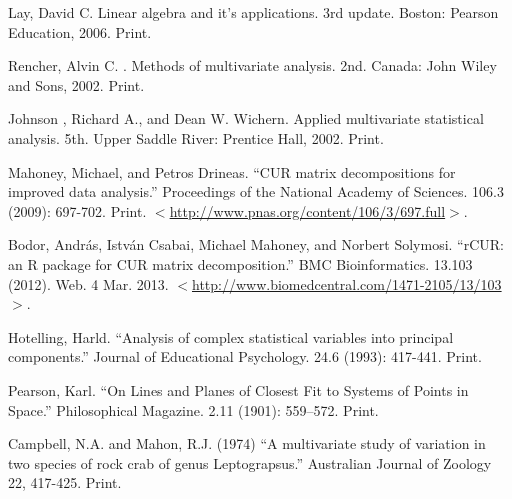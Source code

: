 \documentclass{book}
\begin{document}
\begin{thebibliography}{1}

 Lay, David C. Linear algebra and it's applications. 3rd update. Boston: Pearson Education, 2006. Print.

  Rencher, Alvin C. . Methods of multivariate analysis. 2nd. Canada: John Wiley and Sons, 2002. Print.

  Johnson , Richard A., and Dean W. Wichern. Applied multivariate statistical analysis. 5th. Upper Saddle River: Prentice Hall, 2002. Print.

   Mahoney, Michael, and Petros Drineas. ``CUR matrix decompositions for improved data analysis.'' Proceedings of the National Academy of Sciences. 106.3 (2009): 697-702. Print. $<$\href{http://www.pnas.org/content/106/3/697.full}{http://www.pnas.org/content/106/3/697.full}$>$.

   Bodor, András, István Csabai, Michael Mahoney, and Norbert Solymosi. ``rCUR: an R package for CUR matrix decomposition.'' BMC Bioinformatics. 13.103 (2012). Web. 4 Mar. 2013. $<$\href{http://www.biomedcentral.com/1471-2105/13/103}{http://www.biomedcentral.com/1471-2105/13/103}$>$.

   Hotelling, Harld. ``Analysis of complex statistical variables into principal components.'' Journal of Educational Psychology. 24.6 (1993): 417-441. Print.

   Pearson, Karl. ``On Lines and Planes of Closest Fit to Systems of Points in Space.'' Philosophical Magazine. 2.11 (1901): 559–572. Print.

   Campbell, N.A. and Mahon, R.J. (1974) ``A multivariate study of variation in two species of rock crab of genus Leptograpsus.'' Australian Journal of Zoology 22, 417-425. Print.


  \end{thebibliography}
\end{document}
